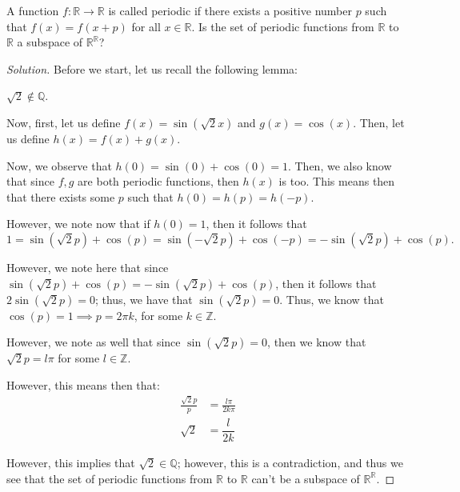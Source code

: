 \documentclass[openany]{book}
\newenvironment{solution}{\begin{proof}[Solution]}{\end{proof}}
\newcommand{\QQ}{\mathbb{Q}}
\newcommand{\RR}{\mathbb{R}}
\newcommand{\ZZ}{\mathbb{Z}}
\begin{document}
	\begin{hw}
		A function $f : \RR \rightarrow \RR$ is called periodic if there exists a positive number $p$ such that $f(x) = f(x+p)$ for all $x \in \RR$. Is the set of periodic functions from $\RR$ to $\RR$ a subspace of $\RR^{\RR}$?
	\end{hw}
	\begin{solution}
		Before we start, let us recall the following lemma:
		\begin{lem}
			$\sqrt{2} \not\in \QQ$.
		\end{lem}
		
		Now, first, let us define $f(x) = \sin (\sqrt 2 x)$ and $g(x) = \cos(x)$. Then, let us define $h(x) = f(x) + g(x)$.
		
		Now, we observe that $h(0) = \sin(0) + \cos(0) = 1$. Then, we also know that since $f,g$ are both periodic functions, then $h(x)$ is too. This means then that there exists some $p$ such that $h(0) = h(p) = h(-p)$.
		
		However, we note now that if $h(0) = 1$, then it follows that
		\begin{equation*}
			1 = \sin(\sqrt 2 p) + \cos(p) = \sin(-\sqrt 2 p) + \cos(-p) = -\sin(\sqrt 2 p) + \cos(p).
		\end{equation*}
	
		However, we note here that since $\sin(\sqrt 2 p) + \cos(p) = -\sin(\sqrt 2 p) + \cos(p)$, then it follows that $2\sin(\sqrt 2 p) = 0$; thus, we have that $\sin(\sqrt 2 p) = 0$. Thus, we know that $\cos(p) = 1 \implies p = 2\pi k$, for some $k \in \ZZ$.
		
		However, we note as well that since $\sin(\sqrt 2 p) = 0$, then we know that $\sqrt 2 p = l\pi$ for some $l \in \ZZ$.
		
		However, this means then that:
		\begin{align*}
			\frac{\sqrt 2 p}{p} &= \frac{l\pi}{2k\pi} \\
			\sqrt 2 &= \dfrac{l}{2k}
		\end{align*}
	
		However, this implies that $\sqrt 2 \in \QQ$; however, this is a contradiction, and thus we see that the set of periodic functions from $\RR$ to $\RR$ can't be a subspace of $\RR^{\RR}$.
	\end{solution}
\end{document}
